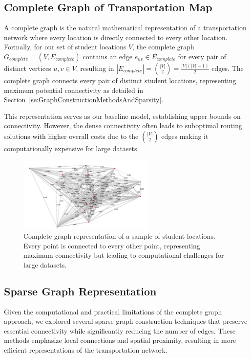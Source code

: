 \subsection{Complete Graph of Transportation Map}
\label{subsec:complete_graph}

A complete graph is the natural mathematical representation of a transportation network where every location is directly connected to every other location. Formally, for our set of student locations $V$, the complete graph $G_{complete} = (V, E_{complete})$ contains an edge $e_{uv} \in E_{complete}$ for every pair of distinct vertices $u, v \in V$, resulting in $|E_{complete}| = {|V| \choose 2} = \frac{|V|(|V|-1)}{2}$ edges. The complete graph connects every pair of distinct student locations, representing maximum potential connectivity as detailed in Section~\ref{se:GraphConstructionMethodsAndSparsity}.

This representation serves as our baseline model, establishing upper bounds on connectivity. However, the dense connectivity often leads to suboptimal routing solutions with higher overall costs due to the ${|V| \choose 2}$ edges making it computationally expensive for large datasets.

\begin{figure}[!htbp]
\centering
\includegraphics[width=0.6\textwidth]{img/complete}
\caption{Complete graph representation of a sample of student locations. Every point is connected to every other point, representing maximum connectivity but leading to computational challenges for large datasets.}
\label{fig:complete_graph}
\end{figure}



\subsection{Sparse Graph Representation}
\label{subsec:sparse_graph}

Given the computational and practical limitations of the complete graph approach, we explored several sparse graph construction techniques that preserve essential connectivity while significantly reducing the number of edges. These methods emphasize local connections and spatial proximity, resulting in more efficient representations of the transportation network.

